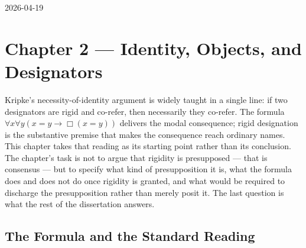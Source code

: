 \documentclass[10pt]{article}
\newlength{\notesmargin}
\begin{document}

\noindent\begin{minipage}{\dimexpr\textwidth+\notesmargin\relax}

  \hfill{\sffamily\normalsize 2026-04-19}

    \vspace{2pt}
  
  \vspace{4pt}
  \noindent{\color{ruleColor}\rule{\linewidth}{0.35pt}}

\end{minipage}

\vspace{3pt}

\section{Chapter 2 --- Identity, Objects, and Designators}\label{chapter-2-identity-objects-and-designators}

Kripke's necessity-of-identity argument is widely taught in a single line: if two designators are rigid and co-refer, then necessarily they co-refer. The formula \(\forall x \forall y (x=y \to \Box(x=y))\) delivers the modal consequence; rigid designation is the substantive premise that makes the consequence reach ordinary names. This chapter takes that reading as its starting point rather than its conclusion. The chapter's task is not to argue that rigidity is presupposed --- that is consensus --- but to specify what kind of presupposition it is, what the formula does and does not do once rigidity is granted, and what would be required to discharge the presupposition rather than merely posit it. The last question is what the rest of the dissertation answers.

\subsection{The Formula and the Standard Reading}\label{the-formula-and-the-standard-reading}
\end{document}
